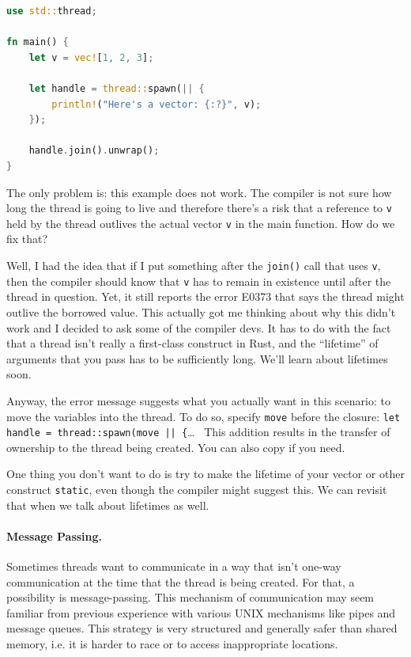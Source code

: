 \begin{lstlisting}[language=Rust]
use std::thread;

fn main() {
    let v = vec![1, 2, 3];

    let handle = thread::spawn(|| {
        println!("Here's a vector: {:?}", v);
    });

    handle.join().unwrap();
}
\end{lstlisting}

The only problem is: this example does not work. The compiler is not sure how long the thread is going to live and therefore there's a risk that a reference to \texttt{v} held by the thread outlives the actual vector \texttt{v} in the main function. How do we fix that?

Well, I had the idea that if I put something after the \texttt{join()} call that uses \texttt{v}, then the compiler should know that \texttt{v} has to remain in existence until after the thread in question. Yet, it still reports the error E0373 that says the thread might outlive the borrowed value. This actually got me thinking about why this didn't work and I decided to ask some of the compiler devs. It has to do with the fact that a thread isn't really a first-class construct in Rust, and the ``lifetime'' of arguments that you pass has to be sufficiently long. We'll learn about lifetimes soon.

Anyway, the error message suggests what you actually want in this scenario: to move the variables into the thread. To do so, specify \texttt{move} before the closure: \texttt{let handle = thread::spawn(move || \{}\ldots~ This addition results in the transfer of ownership to the thread being created. You can also copy if you need. 

One thing you don't want to do is try to make the lifetime of your vector or other construct \texttt{static}, even though the compiler might suggest this. We can revisit that when we talk about lifetimes as well.

\paragraph{Message Passing.} Sometimes threads want to communicate in a way that isn't one-way communication at the time that the thread is being created. For that, a possibility is message-passing. This mechanism of communication may seem familiar from previous experience with various UNIX mechanisms like pipes and message queues. This strategy is very structured and generally safer than shared memory, i.e. it is harder to race or to access inappropriate locations.

